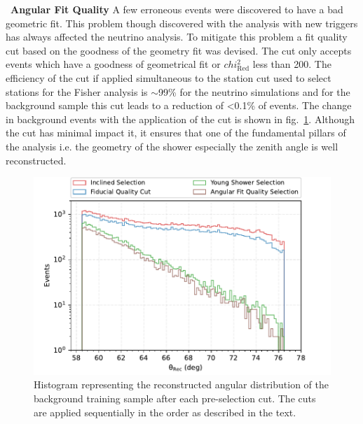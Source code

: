 \begin{description}
  \item ~\textbf{Angular Fit Quality} A few erroneous events were discovered to have a bad geometric fit. This problem though discovered with the analysis with new triggers has always affected the neutrino analysis. To mitigate this problem a fit quality cut based on the goodness of the geometry fit was devised. The cut only accepts events which have a goodness of geometrical fit or $chi^2_{\text{Red}}$ less than 200. The efficiency of the cut if applied simultaneous to the station cut used to select stations for the Fisher analysis is $\sim$99\% for the neutrino simulations and for the background sample this cut leads to a reduction of <0.1\% of events. The change in background events with the application of the cut is shown in fig.~\ref{fig:Pre_cut_summary}. Although the cut has minimal impact it, it ensures that one of the fundamental pillars of the analysis i.e. the geometry of the shower especially the zenith angle is well reconstructed.
\end{description} 

\begin{figure}[t!]
  \centering
  \includegraphics[width=14.5cm]{thesis_figures/Nu_analysis/Selection_bkg_theta_wnt_redcut_2.pdf}
  \caption{Histogram representing the reconstructed angular distribution of the background training sample after each pre-selection cut. The cuts are applied sequentially in the order as described in the text.}
  \label{fig:Pre_cut_summary}
\end{figure}

